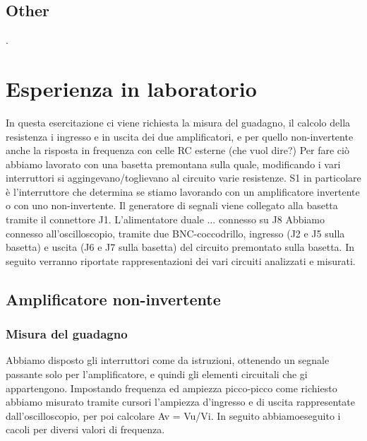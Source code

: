 \documentclass[a4paper]{article}
\begin{document}
		\subsection{Other}
			.
	\section{Esperienza in laboratorio}
		In questa esercitazione ci viene richiesta la misura del guadagno, il calcolo della resistenza i ingresso e in uscita dei due amplificatori, e per quello non-invertente anche la risposta in frequenza con celle RC esterne (che vuol dire?)
		Per fare ciò abbiamo lavorato con una basetta premontana sulla quale, modificando i vari interruttori si aggingevano/toglievano al circuito varie resistenze.
		S1 in particolare è l'interruttore che determina se stiamo lavorando con un amplificatore invertente o con uno non-invertente.
		Il generatore di segnali viene collegato alla basetta tramite il connettore J1.
		L'alimentatore duale ... connesso su J8
		Abbiamo connesso all'oscilloscopio, tramite due BNC-coccodrillo, ingresso (J2 e J5 sulla basetta)
		e uscita (J6 e J7 sulla basetta) del circuito premontato sulla basetta. %
		In seguito verranno riportate rappresentazioni dei vari circuiti analizzati e misurati.
		\subsection{Amplificatore non-invertente}
			\subsubsection{Misura del guadagno}
				Abbiamo disposto gli interruttori come da istruzioni, ottenendo un segnale passante solo per l'amplificatore, e quindi gli elementi circuitali che gi appartengono. %
				Impostando frequenza ed ampiezza picco-picco come richiesto abbiamo misurato tramite cursori l'ampiezza d'ingresso e di uscita rappresentate dall'oscilloscopio, per poi calcolare Av = Vu/Vi.
				In seguito abbiamoeseguito i cacoli per diversi valori di frequenza.
\end{document}
